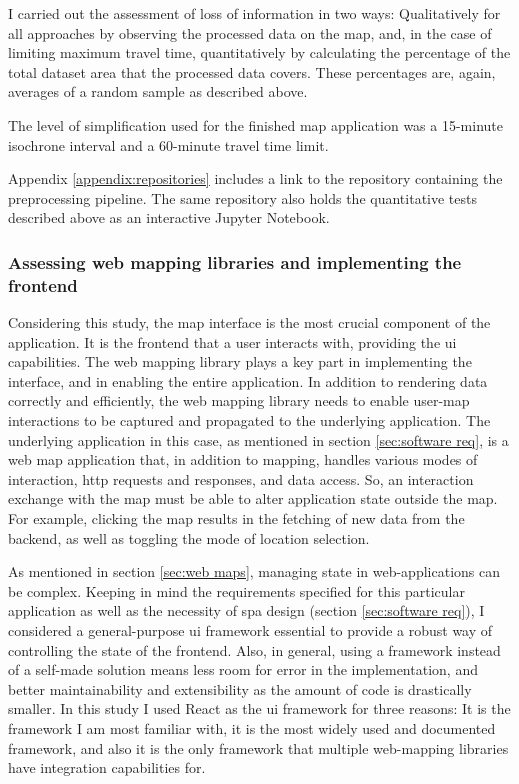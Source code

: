 I carried out the assessment of loss of information in two ways:
Qualitatively for all approaches by observing the processed data on the map,
and, in the case of limiting maximum travel time,
quantitatively by calculating the percentage of the total dataset area
that the processed data covers.
These percentages are, again, averages of a random sample as described above.

The level of simplification used for the finished map application was
a 15-minute isochrone interval and a 60-minute travel time limit.

Appendix \ref{appendix:repositories} includes a link to the repository
containing the preprocessing pipeline.
The same repository also holds the quantitative tests described above
as an interactive Jupyter Notebook.


\subsubsection{Assessing web mapping libraries and implementing the frontend}

Considering this study,
the map interface is the most crucial component of the application.
It is the frontend that a user interacts with,
providing the \acrshort{ui} capabilities.
The web mapping library plays a key part in implementing the interface,
and in enabling the entire application.
In addition to rendering data correctly and efficiently,
the web mapping library needs to enable user-map interactions to be
captured and propagated to the underlying application.
The underlying application in this case, as mentioned in
section \ref{sec:software req},
is a web map application
that, in addition to mapping,
handles various modes of interaction,
\acrshort{http} requests and responses, and data access.
So, an interaction exchange with the map
must be able to alter application state outside the map.
For example,
clicking the map results in the fetching of new data from the backend,
as well as toggling the mode of location selection.

As mentioned in section \ref{sec:web maps},
managing state in web-applications can be complex.
Keeping in mind the requirements specified for this particular application
as well as the necessity of \acrshort{spa} design (section \ref{sec:software req}),
I considered a general-purpose \acrshort{ui} framework
essential to provide a robust way of controlling the state of the frontend.
Also, in general, using a framework instead of a self-made solution
means less room for error in the implementation,
and better maintainability and extensibility as the amount of code is drastically smaller.
In this study I used React \parencite{react} as the \acrshort{ui} framework
for three reasons:
It is the framework I am most familiar with,
it is the most widely used and documented framework,
and also it is the only framework that
multiple web-mapping libraries have integration capabilities for.

